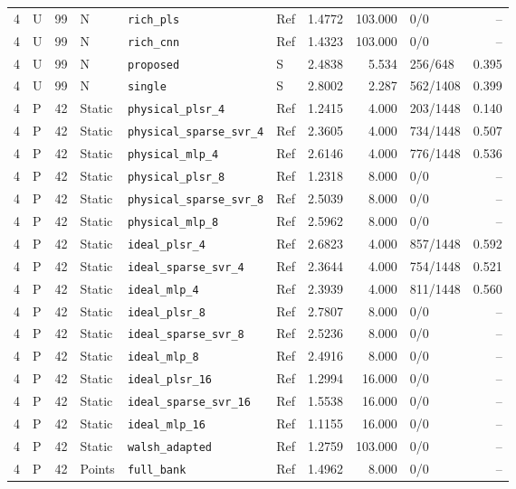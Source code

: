 \documentclass[10pt,a4paper]{article}
\begin{document}
\begin{landscape}
\begin{longtable}{rlrlllrrlr}
4 & U & 99 & N & \texttt{rich\_pls} & Ref & 1.4772 & 103.000 & 0/0 & -- \\
4 & U & 99 & N & \texttt{rich\_cnn} & Ref & 1.4323 & 103.000 & 0/0 & -- \\
4 & U & 99 & N & \texttt{proposed} & S & 2.4838 & 5.534 & 256/648 & 0.395 \\
4 & U & 99 & N & \texttt{single} & S & 2.8002 & 2.287 & 562/1408 & 0.399 \\
4 & P & 42 & Static & \texttt{physical\_plsr\_4} & Ref & 1.2415 & 4.000 & 203/1448 & 0.140 \\
4 & P & 42 & Static & \texttt{physical\_sparse\_svr\_4} & Ref & 2.3605 & 4.000 & 734/1448 & 0.507 \\
4 & P & 42 & Static & \texttt{physical\_mlp\_4} & Ref & 2.6146 & 4.000 & 776/1448 & 0.536 \\
4 & P & 42 & Static & \texttt{physical\_plsr\_8} & Ref & 1.2318 & 8.000 & 0/0 & -- \\
4 & P & 42 & Static & \texttt{physical\_sparse\_svr\_8} & Ref & 2.5039 & 8.000 & 0/0 & -- \\
4 & P & 42 & Static & \texttt{physical\_mlp\_8} & Ref & 2.5962 & 8.000 & 0/0 & -- \\
4 & P & 42 & Static & \texttt{ideal\_plsr\_4} & Ref & 2.6823 & 4.000 & 857/1448 & 0.592 \\
4 & P & 42 & Static & \texttt{ideal\_sparse\_svr\_4} & Ref & 2.3644 & 4.000 & 754/1448 & 0.521 \\
4 & P & 42 & Static & \texttt{ideal\_mlp\_4} & Ref & 2.3939 & 4.000 & 811/1448 & 0.560 \\
4 & P & 42 & Static & \texttt{ideal\_plsr\_8} & Ref & 2.7807 & 8.000 & 0/0 & -- \\
4 & P & 42 & Static & \texttt{ideal\_sparse\_svr\_8} & Ref & 2.5236 & 8.000 & 0/0 & -- \\
4 & P & 42 & Static & \texttt{ideal\_mlp\_8} & Ref & 2.4916 & 8.000 & 0/0 & -- \\
4 & P & 42 & Static & \texttt{ideal\_plsr\_16} & Ref & 1.2994 & 16.000 & 0/0 & -- \\
4 & P & 42 & Static & \texttt{ideal\_sparse\_svr\_16} & Ref & 1.5538 & 16.000 & 0/0 & -- \\
4 & P & 42 & Static & \texttt{ideal\_mlp\_16} & Ref & 1.1155 & 16.000 & 0/0 & -- \\
4 & P & 42 & Static & \texttt{walsh\_adapted} & Ref & 1.2759 & 103.000 & 0/0 & -- \\
4 & P & 42 & Points & \texttt{full\_bank} & Ref & 1.4962 & 8.000 & 0/0 & -- \\

\end{longtable}
\end{landscape}
\end{document}
